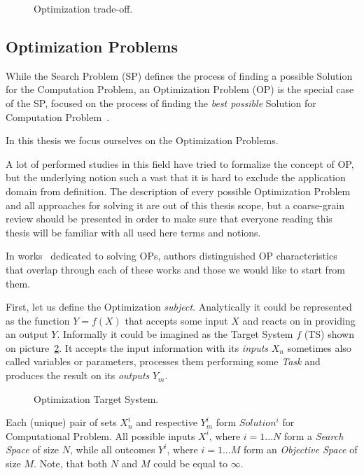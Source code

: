 \begin{figure}
	\centering
	
	\caption{Optimization trade-off.}
	\label{bg:pic:Optimization tradeoff}
\end{figure}

\subsection{Optimization Problems}\label{BG: subsection OPs}
While the Search Problem (SP) defines the process of finding a possible Solution for the Computation Problem, an Optimization Problem (OP) is the special case of the SP, focused on the process of finding the \emph{best possible} Solution for Computation Problem~\cite{goldreich2010p}.

In this thesis we focus ourselves on the Optimization Problems.

A lot of performed studies in this field have tried to formalize the concept of OP, but the underlying notion such a vast that it is hard to exclude the application domain from definition. The description of every possible Optimization Problem and all approaches for solving it are out of this thesis scope, but a coarse-grain review should be presented in order to make sure that everyone reading this thesis will be familiar with all used here terms and notions. 

In works~\cite{biegler2004retrospective,figueira2014hybrid,amaran2016simulation} dedicated to solving OPs, authors distinguished OP characteristics that overlap through each of these works and those we would like to start from them.


First, let us define the Optimization \textit{subject}. Analytically it could be represented as the function $Y = f(X)$ that accepts some input $X$ and reacts on in providing an output $Y$. Informally it could be imagined as the Target System $f$ (TS) shown on picture~\ref{bg:pic:Target System}. It accepts the input information with its \textit{inputs} $X_n$ sometimes also called variables or parameters, processes them performing some \textit{Task} and produces the result on its \textit{outputs} $Y_m$.

\begin{figure}
	\centering
	
	\caption{Optimization Target System.}
	\label{bg:pic:Target System}
\end{figure}

Each (unique) pair of sets $X_n^i$ and respective $Y_m^i$ form $Solution^i$ for Computational Problem.
All possible inputs $X^i$, where $i=1...N$ form a \textit{Search Space} of size $N$, while all outcomes $Y^i$, where $i=1...M$ form an \textit{Objective Space} of size $M$. Note, that both $N$ and $M$ could be equal to $\infty$.

